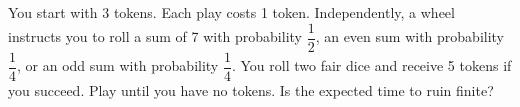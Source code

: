 You start with 3 tokens. Each play costs 1 token. Independently, a wheel instructs you to roll a sum of 7 with probability $\dfrac{1}{2}$, an even sum with probability $\dfrac{1}{4}$, or an odd sum with probability $\dfrac{1}{4}$. You roll two fair dice and receive 5 tokens if you succeed. Play until you have no tokens. Is the expected time to ruin finite?
